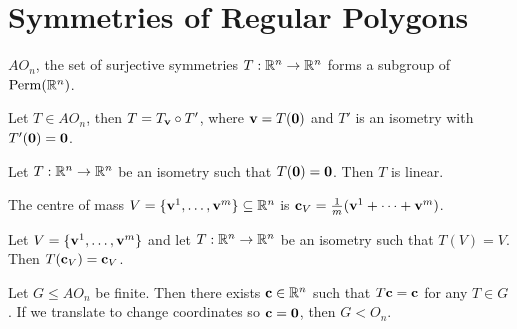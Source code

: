 \section{Symmetries of Regular Polygons}

\(AO_n\), the set of surjective symmetries \(T : \mathbb{R}^n \to \mathbb{R}^n\) forms a subgroup of \(\operatorname{Perm}(\mathbb{R}^n)\).

\begin{proposition}
    Let \(T \in AO_n\), then \(T = T_{\mathbf{v}} \circ T'\), where \(\mathbf{v} = T(\mathbf{0})\) and \(T'\) is an isometry with \(T'(\mathbf{0}) = \mathbf{0}\).
\end{proposition}

\begin{theorem}
    Let \(T: \mathbb{R}^n \to \mathbb{R}^n\) be an isometry such that \(T(\mathbf{0}) = \mathbf{0}\). Then \(T\) is linear.
\end{theorem}

The centre of mass \(V = \{\mathbf{v}^1, \dots, \mathbf{v}^m\} \subseteq \mathbb{R}^n\) is \(\mathbf{c}_V = \frac{1}{m}(\mathbf{v}^1 + \dots + \mathbf{v}^m)\).

\begin{corollary}
    Let \(V = \{\mathbf{v}^1, \dots, \mathbf{v}^m\}\) and let \(T: \mathbb{R}^n \to \mathbb{R}^n\) be an isometry such that \(T(V) = V\). Then \(T(\mathbf{c}_V) = \mathbf{c}_V\).
\end{corollary}

\begin{corollary}
    Let \(G \leq AO_n\) be finite. Then there exists \(\mathbf{c} \in \mathbb{R}^n\) such that \(T\mathbf{c} = \mathbf{c}\) for any \(T \in G\). If we translate to change coordinates so \(\mathbf{c} = \mathbf{0}\), then \(G < O_n\).
\end{corollary}

